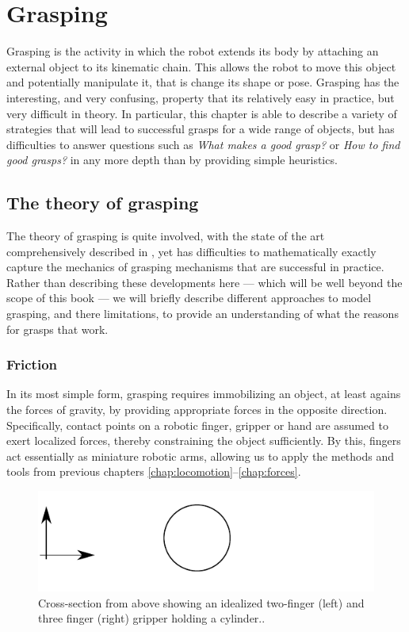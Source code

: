 \chapter{Grasping}
Grasping is the activity in which the robot extends its body by attaching an external object to its kinematic chain. This allows the robot to move this object and potentially manipulate it, that is change its shape or pose. Grasping has the interesting, and very confusing, property that its relatively easy in practice, but very difficult in theory. In particular, this chapter is able to describe a variety of strategies that will lead to successful grasps for a wide range of objects, but has difficulties to answer questions such as \emph{What makes a good grasp?} or \emph{How to find good grasps?} in any more depth than by providing simple heuristics. 

\section{The theory of grasping}
The theory of grasping is quite involved, with the state of the art comprehensively described in \cite{rimon2019mechanics}, yet has difficulties to mathematically exactly capture the mechanics of grasping mechanisms that are successful in practice. Rather than describing these developments here --- which will be well beyond the scope of this book --- we will briefly describe different approaches to model grasping, and there limitations, to provide an understanding of what the reasons for grasps that work. 

\subsection{Friction}
In its most simple form, grasping requires immobilizing an object, at least agains the forces of gravity, by providing appropriate forces in the opposite direction. Specifically, contact points on a robotic finger, gripper or hand are assumed to exert localized forces, thereby constraining the object sufficiently. By this, fingers act essentially as miniature robotic arms, allowing us to apply the methods and tools from previous chapters \ref{chap:locomotion}--\ref{chap:forces}. 

\begin{figure}
\includegraphics[width=\columnwidth]{figs/idealgrasp}
\caption{Cross-section from above showing an idealized two-finger (left) and three finger (right) gripper holding a cylinder.\label{fig:idealgrasp}.}
\end{figure}

